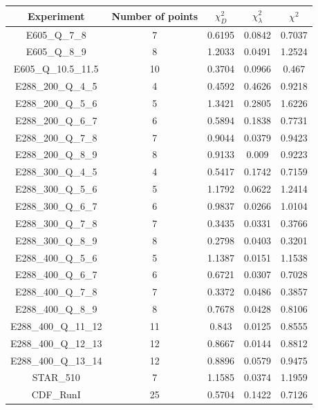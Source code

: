 \documentclass[
]{article}
\begin{document}
\begin{table}[h]

\centering

\begin{tabular}{|c|c|c|c|c|} \hline

\textbf{Experiment} & \textbf{Number of
points} & \textbf{\(\chi_{D}^2\)} & \textbf{\(\chi_{\lambda}^2\)} & \textbf{\(\chi^2\)} \\ \hline

E605\_Q\_7\_8 & 7 & 0.6195 & 0.0842 & 0.7037 \\ \hline
E605\_Q\_8\_9 & 8 & 1.2033 & 0.0491 & 1.2524 \\ \hline
E605\_Q\_10.5\_11.5 & 10 & 0.3704 & 0.0966 & 0.467 \\ \hline
E288\_200\_Q\_4\_5 & 4 & 0.4592 & 0.4626 & 0.9218 \\ \hline
E288\_200\_Q\_5\_6 & 5 & 1.3421 & 0.2805 & 1.6226 \\ \hline
E288\_200\_Q\_6\_7 & 6 & 0.5894 & 0.1838 & 0.7731 \\ \hline
E288\_200\_Q\_7\_8 & 7 & 0.9044 & 0.0379 & 0.9423 \\ \hline
E288\_200\_Q\_8\_9 & 8 & 0.9133 & 0.009 & 0.9223 \\ \hline
E288\_300\_Q\_4\_5 & 4 & 0.5417 & 0.1742 & 0.7159 \\ \hline
E288\_300\_Q\_5\_6 & 5 & 1.1792 & 0.0622 & 1.2414 \\ \hline
E288\_300\_Q\_6\_7 & 6 & 0.9837 & 0.0266 & 1.0104 \\ \hline
E288\_300\_Q\_7\_8 & 7 & 0.3435 & 0.0331 & 0.3766 \\ \hline
E288\_300\_Q\_8\_9 & 8 & 0.2798 & 0.0403 & 0.3201 \\ \hline
E288\_400\_Q\_5\_6 & 5 & 1.1387 & 0.0151 & 1.1538 \\ \hline
E288\_400\_Q\_6\_7 & 6 & 0.6721 & 0.0307 & 0.7028 \\ \hline
E288\_400\_Q\_7\_8 & 7 & 0.3372 & 0.0486 & 0.3857 \\ \hline
E288\_400\_Q\_8\_9 & 8 & 0.7678 & 0.0428 & 0.8106 \\ \hline
E288\_400\_Q\_11\_12 & 11 & 0.843 & 0.0125 & 0.8555 \\ \hline
E288\_400\_Q\_12\_13 & 12 & 0.8667 & 0.0144 & 0.8812 \\ \hline
E288\_400\_Q\_13\_14 & 12 & 0.8896 & 0.0579 & 0.9475 \\ \hline
STAR\_510 & 7 & 1.1585 & 0.0374 & 1.1959 \\ \hline
CDF\_RunI & 25 & 0.5704 & 0.1422 & 0.7126 \\ \hline

\end{tabular}
\end{table}
\end{document}
